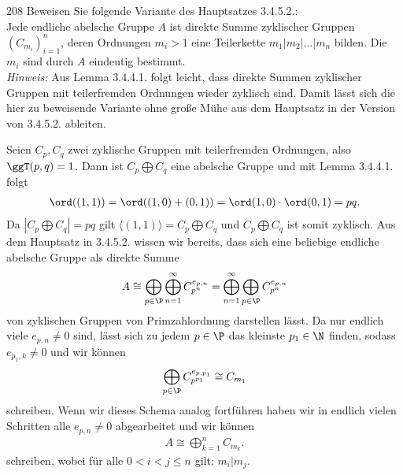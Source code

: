 \begin{algebraUE}{208}
Beweisen Sie folgende Variante des Hauptsatzes 3.4.5.2.: \\
Jede endliche abelsche Gruppe $A$ ist direkte Summe zyklischer Gruppen $(C_{m_i})_{i=1}^n$,
deren Ordnungen $m_i > 1$ eine Teilerkette $m_1 | m_2 | \dots | m_n$ bilden.
Die $m_i$ sind durch $A$ eindeutig bestimmt. \\
\textit{Hinweis:} Aus Lemma 3.4.4.1. folgt leicht, dass direkte Summen zyklischer
Gruppen mit teilerfremden Ordnungen wieder zyklisch sind. Damit lässt sich die
hier zu beweisende Variante ohne große Mühe aus dem Hauptsatz in der Version
von 3.4.5.2. ableiten.
\end{algebraUE}
\begin{solution}
Seien $C_p, C_q$ zwei zyklische Gruppen mit teilerfremden Ordnungen, also
$\ggT(p,q) = 1$. Dann ist $C_p \bigoplus C_q$ eine abelsche Gruppe und mit
Lemma 3.4.4.1. folgt
\begin{align*}
  \ord((1,1)) = \ord((1,0) + (0,1)) = \ord(1,0) \cdot \ord(0,1) = pq.
\end{align*}
Da $|C_p \bigoplus C_q| = pq$ gilt $\langle (1,1) \rangle = C_p \bigoplus C_q$
und $C_p \bigoplus C_q$ ist somit zyklisch.
Aus dem Hauptsatz in 3.4.5.2. wissen wir bereits, dass sich eine beliebige endliche
abelsche Gruppe als direkte Summe
\begin{align*}
  A \cong \bigoplus_{p \in \P}\bigoplus_{n=1}^{\infty}C_{p^n}^{e_{p,n}}
  =  \bigoplus_{n=1}^{\infty}\bigoplus_{p \in \P}C_{p^n}^{e_{p,n}}
\end{align*}
von zyklischen Gruppen von Primzahlordnung darstellen lässt.
Da nur endlich viele $e_{p,n} \neq 0$ sind, lässt sich zu jedem $p \in \P$
das kleinste $p_1 \in \N$ finden, sodass $e_{p_1,k} \neq 0$ und wir können
\begin{align*}
  \bigoplus_{p \in \P}C_{p^{p_1}}^{e_{p,p_1}} \cong C_{m_1}
\end{align*}
schreiben. Wenn wir dieses Schema analog fortführen haben wir in endlich vielen
Schritten alle $e_{p,n} \neq 0$ abgearbeitet und wir können
\begin{align*}
  A \cong \bigoplus_{k=1}^{n} C_{m_k}.
\end{align*}
schreiben, wobei für alle $0 < i < j \leq n $ gilt: $m_i | m_j$.

\end{solution}
